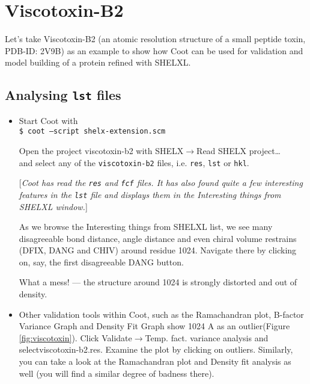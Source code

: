 \documentclass{article}
\begin{document}


\section{Viscotoxin-B2}
Let's take Viscotoxin-B2 (an atomic resolution structure of a small peptide toxin, PDB-ID: 2V9B) as an example to show how Coot can be used for validation and model building of a protein refined with SHELXL.

\subsection{Analysing \texttt{lst} files}

\begin{itemize}
\item Start Coot with\\\texttt{\$ coot --script shelx-extension.scm}

Open the project viscotoxin-b2 with \textsf{SHELX$\to$Read SHELX project\ldots}\\and select any of the \texttt{viscotoxin-b2} files, i.e. \texttt{res}, \texttt{lst} or \texttt{hkl}.

[\textsl{Coot has read the \texttt{res} and \texttt{fcf} files. It has also found quite a few interesting features in the \texttt{lst} file and displays them in the \textsf{Interesting things from SHELXL} window.}]

As we browse the Interesting things from SHELXL list, we see many disagreeable bond distance, angle distance and even chiral volume restrains (DFIX, DANG and CHIV) around residue 1024. Navigate there by clicking on, say, the first disagreeable DANG button.

What a mess! --- the structure around 1024 is strongly distorted and out of density.

\item Other validation tools within Coot, such as the Ramachandran plot, B-factor Variance Graph and Density Fit Graph show 1024 A as an outlier\linebreak[4](Figure \ref{fig:viscotoxin}). Click \textsf{Validate$\to$Temp. fact. variance analysis} and select\linebreak[4]\textsf{viscotoxin-b2.res}. Examine the plot by clicking on outliers. Similarly, you can take a look at the Ramachandran plot and Density fit analysis as well (you will find a similar degree of badness there).


\end{itemize}
\end{document}
